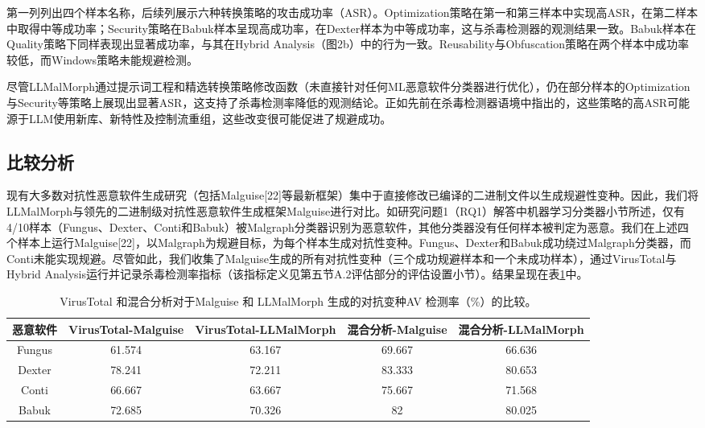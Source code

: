 第一列列出四个样本名称，后续列展示六种转换策略的攻击成功率（ASR）。Optimization策略在第一和第三样本中实现高ASR，在第二样本中取得中等成功率；Security策略在Babuk样本呈现高成功率，在Dexter样本为中等成功率，这与杀毒检测器的观测结果一致。Babuk样本在Quality策略下同样表现出显著成功率，与其在Hybrid Analysis（图2b）中的行为一致。Reusability与Obfuscation策略在两个样本中成功率较低，而Windows策略未能规避检测。


尽管LLMalMorph通过提示词工程和精选转换策略修改函数（未直接针对任何ML恶意软件分类器进行优化），仍在部分样本的Optimization与Security等策略上展现出显著ASR，这支持了杀毒检测率降低的观测结论。正如先前在杀毒检测器语境中指出的，这些策略的高ASR可能源于LLM使用新库、新特性及控制流重组，这些改变很可能促进了规避成功。

\subsection{比较分析}
现有大多数对抗性恶意软件生成研究（包括Malguise[22]等最新框架）集中于直接修改已编译的二进制文件以生成规避性变种。因此，我们将LLMalMorph与领先的二进制级对抗性恶意软件生成框架Malguise进行对比。如研究问题1（RQ1）解答中机器学习分类器小节所述，仅有4/10样本（Fungus、Dexter、Conti和Babuk）被Malgraph分类器识别为恶意软件，其他分类器没有任何样本被判定为恶意。我们在上述四个样本上运行Malguise[22]，以Malgraph为规避目标，为每个样本生成对抗性变种。Fungus、Dexter和Babuk成功绕过Malgraph分类器，而Conti未能实现规避。尽管如此，我们收集了Malguise生成的所有对抗性变种（三个成功规避样本和一个未成功样本），通过VirusTotal与Hybrid Analysis运行并记录杀毒检测率指标（该指标定义见第五节A.2评估部分的评估设置小节）。结果呈现在表\ref{tab:5.2}中。

\begin{table}[htbp]
	\centering
	\caption{VirusTotal 和混合分析对于Malguise 和 LLMalMorph 生成的对抗变种AV 检测率（\%）的比较。}
	\label{tab:5.2}
	\begin{tabular*}{\textwidth}{@{\extracolsep{\fill}}ccccc}
		\toprule
		恶意软件 & VirusTotal-Malguise & VirusTotal-LLMalMorph & 混合分析-Malguise & 混合分析-LLMalMorph \\
		\midrule
		Fungus & 61.574 & 63.167 & 69.667 & 66.636 \\
		Dexter & 78.241 & 72.211 & 83.333 & 80.653 \\
		Conti & 66.667 & 63.667 & 75.667 & 71.568 \\
		Babuk & 72.685 & 70.326 & 82 & 80.025 \\
		\bottomrule
	\end{tabular*}
\end{table}

